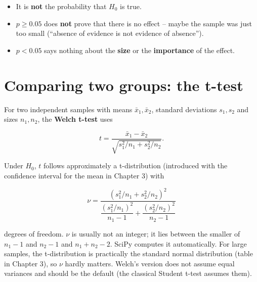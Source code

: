 \documentclass[
  letterpaper,
  DIV=11,
  numbers=noendperiod]{scrreprt}
\providecommand{\tightlist}{%
  \setlength{\itemsep}{0pt}\setlength{\parskip}{0pt}}\usepackage{longtable,booktabs,array}
\begin{document}
\begin{tcolorbox}[enhanced jigsaw, left=2mm, title=\textcolor{quarto-callout-warning-color}{\faExclamationTriangle}\hspace{0.5em}{Pitfall: what the p-value is not}, opacityback=0, breakable, rightrule=.15mm, arc=.35mm, toptitle=1mm, colbacktitle=quarto-callout-warning-color!10!white, opacitybacktitle=0.6, coltitle=black, colframe=quarto-callout-warning-color-frame, bottomrule=.15mm, leftrule=.75mm, bottomtitle=1mm, titlerule=0mm, toprule=.15mm, colback=white]

\begin{itemize}
\tightlist
\item
  It is \textbf{not} the probability that \(H_0\) is true.
\item
  \(p \ge 0.05\) does \textbf{not} prove that there is no effect --
  maybe the sample was just too small (``absence of evidence is not
  evidence of absence'').
\item
  \(p < 0.05\) says nothing about the \textbf{size} or the
  \textbf{importance} of the effect.
\end{itemize}

\end{tcolorbox}

\section{Comparing two groups: the
t-test}\label{comparing-two-groups-the-t-test}

For two independent samples with means \(\bar x_1, \bar x_2\), standard
deviations \(s_1, s_2\) and sizes \(n_1, n_2\), the \textbf{Welch
t-test} uses

\[t = \frac{\bar x_1 - \bar x_2}{\sqrt{s_1^2/n_1 + s_2^2/n_2}}.\]

Under \(H_0\), \(t\) follows approximately a t-distribution (introduced
with the confidence interval for the mean in Chapter 3) with

\[\nu = \frac{\left(s_1^2/n_1 + s_2^2/n_2\right)^2}{\dfrac{(s_1^2/n_1)^2}{n_1 - 1} + \dfrac{(s_2^2/n_2)^2}{n_2 - 1}}\]

degrees of freedom. \(\nu\) is usually not an integer; it lies between
the smaller of \(n_1 - 1\) and \(n_2 - 1\) and \(n_1 + n_2 - 2\). SciPy
computes it automatically. For large samples, the t-distribution is
practically the standard normal distribution (table in Chapter 3), so
\(\nu\) hardly matters. Welch's version does not assume equal variances
and should be the default (the classical Student t-test assumes them).
\end{document}
